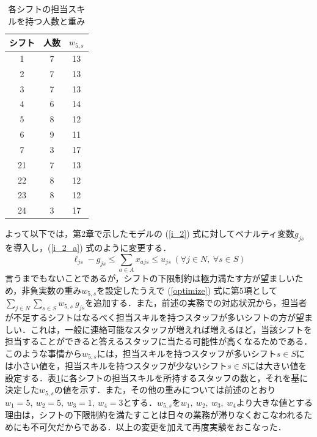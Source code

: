 \documentclass[twocolumn]{jsarticle}
\begin{document}
\begin{table}[htb]
\begin{center}
\caption{各シフトの担当スキルを持つ人数と重み}
\label{tab:shift_can_num}
\begin{tabular}{ccc}
        	\hline \hline
            シフト & 人数 & $w_{5,s}$ \\ \hline
            1 & 7 & 13 \\
            2 & 7 & 13 \\
            3 & 7 & 13 \\
            4 & 6 & 14 \\
            5 & 8 & 12 \\
            6 & 9 & 11\\
            7 & 3 & 17\\
            21& 7 & 13 \\
            22 & 8 & 12 \\
            23 & 8 & 12 \\
            24 & 3 & 17\\ \hline \hline
        \end{tabular}
\end{center}
\end{table}
よって以下では，第2章で示したモデルの (\ref{i_2}) 式に対してペナルティ変数$g_{js}$を導入し，(\ref{i_2_a}) 式のように変更する．
\begin{equation}
\ell_{js} - g_{js} \leq \sum_{a \in A} x_{ajs} \leq u_{js} \ (\forall j \in N, \ \forall s \in S)
\label{i_2_a}
\end{equation}
言うまでもないことであるが，シフトの下限制約は極力満たす方が望ましいため，非負実数の重み$w_{5,s}$を設定したうえで (\ref{optimize}) 式に第5項として $\displaystyle \sum_{j \in N} \sum_{s \in S} w_{5,s} \ g_{js} $を追加する．また，前述の実務での対応状況から，担当者が不足するシフトはなるべく担当スキルを持つスタッフが多いシフトの方が望ましい．これは，一般に連絡可能なスタッフが増えれば増えるほど，当該シフトを担当することができると答えるスタッフに当たる可能性が高くなるためである．このような事情から$w_{5,s}$には，担当スキルを持つスタッフが多いシフト$s \in S$には小さい値を，担当スキルを持つスタッフが少ないシフト$s \in S$には大きい値を設定する．表\ref{tab:shift_can_num}に各シフトの担当スキルを所持するスタッフの数と，それを基に決定した$w_{5,s}$の値を示す．また，その他の重みについては前述のとおり$w_1 = 5, \ w_2 = 5, \ w_3 = 1, \ w_4 = 3$とする．$w_{5,s}$を$w_1, \ w_2, \ w_3, \ w_4$より大きな値とする理由は，シフトの下限制約を満たすことは日々の業務が滞りなくおこなわれるためにも不可欠だからである．以上の変更を加えて再度実験をおこなった．
\end{document}

